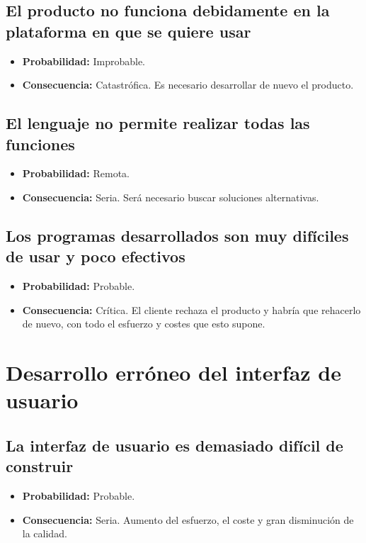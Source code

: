 \documentclass[spanish,a4paper,12pt]{report}	%
\begin{document}
	\subsection*{El producto no funciona debidamente en la plataforma en que se quiere usar}
		\begin{itemize}
			\item \textbf {Probabilidad: }Improbable.
			\item \textbf {Consecuencia: }Catastrófica. Es necesario desarrollar de nuevo el producto.
		\end{itemize}
	
	\subsection*{El lenguaje no permite realizar todas las funciones}
		\begin{itemize}
			\item \textbf {Probabilidad: }Remota.
			\item \textbf {Consecuencia: }Seria. Será necesario buscar soluciones alternativas.
		\end{itemize}
		
	\subsection*{Los programas desarrollados son muy difíciles de usar y poco efectivos}	
		\begin{itemize}
			\item \textbf {Probabilidad: }Probable.
			\item \textbf {Consecuencia: }Crítica. El cliente rechaza el producto y habría que rehacerlo de nuevo, 
										  con todo el esfuerzo y costes que esto supone.
		\end{itemize}
	


%
\section{Desarrollo erróneo del interfaz de usuario}

	\subsection*{La interfaz de usuario es demasiado difícil de construir}
		\begin{itemize}
			\item \textbf {Probabilidad: }Probable.
			\item \textbf {Consecuencia: }Seria. Aumento del esfuerzo, el coste y gran disminución de la calidad.
		\end{itemize}
	
\end{document}
